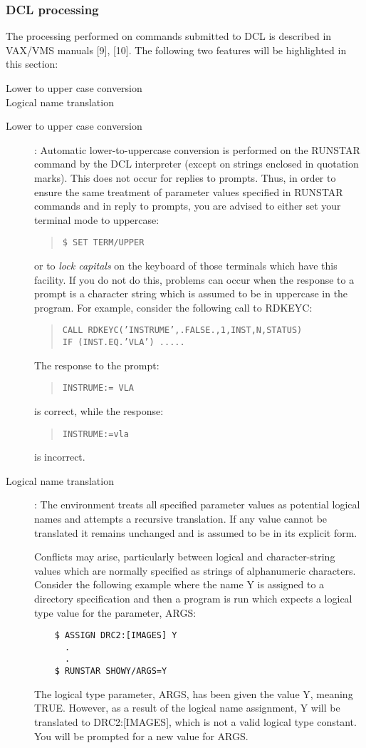 \documentclass{article}
\begin{document}
\subsubsection {DCL processing}
The processing performed on commands submitted to DCL is described in VAX/VMS
manuals [9], [10].
The following two features will be highlighted in this section:
\begin{description}
\item [Lower to upper case conversion]
\item [Logical name translation]
\end{description}
\begin{description}
\item [Lower to upper case conversion]:
Automatic lower-to-uppercase conversion is performed on the RUNSTAR command by
the DCL interpreter (except on strings enclosed in quotation marks).
This does not occur for replies to prompts.
Thus, in order to ensure the same treatment of parameter values specified in
RUNSTAR commands and in reply to prompts, you are advised to either set your
terminal mode to uppercase:
\begin{quote}
{\tt \$ SET TERM/UPPER}
\end{quote}
or to {\em lock capitals} on the keyboard of those terminals which have this
facility.
If you do not do this, problems can occur when the response to a prompt is a
character string which is assumed to be in uppercase in the program.
For example, consider the following call to RDKEYC:
\begin{quote}
{\tt CALL RDKEYC('INSTRUME',.FALSE.,1,INST,N,STATUS)\\
IF (INST.EQ.'VLA') .....}
\end{quote}
The response to the prompt:
\begin{quote}
{\tt INSTRUME:= VLA}
\end{quote}
is correct, while the response:
\begin{quote}
{\tt INSTRUME:=vla}
\end{quote}
is incorrect.
\item [Logical name translation]:
The environment treats all specified parameter values as potential logical
names and attempts a recursive translation.
If any value cannot be translated it remains unchanged and is assumed to be in
its explicit form.

Conflicts may arise, particularly between logical and character-string
values which are normally specified as strings of alphanumeric characters.
Consider the following example where the name Y is assigned to a directory
specification and then a program is run which expects a logical type value for
the parameter, ARGS:
\begin{verbatim}
    $ ASSIGN DRC2:[IMAGES] Y
      .
      .
    $ RUNSTAR SHOWY/ARGS=Y
\end{verbatim}
The logical type parameter, ARGS, has been given the value Y, meaning TRUE.
However, as a result of the logical name assignment, Y will be translated to
DRC2:[IMAGES], which is not a valid logical type constant.
You will be prompted for a new value for ARGS.


\end{description}
\end{document}
